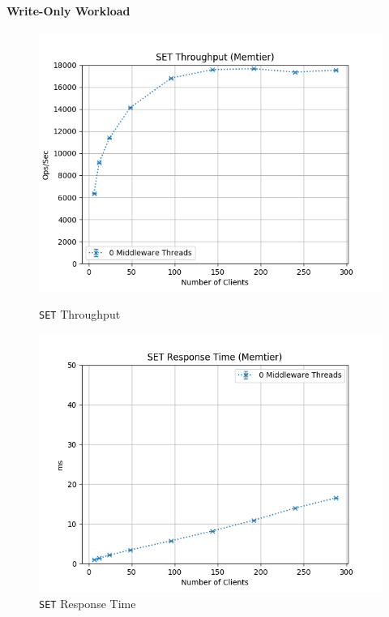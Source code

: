 \documentclass[11pt,a4paper]{article}
\begin{document}
\paragraph{Write-Only Workload}
%
\begin{figure}[H]
	\centering
	\captionsetup{width=0.4\textwidth}
    \begin{minipage}{0.5\textwidth}
        \centering
        \includegraphics[width=\textwidth]{../illustrations/plots/1_1_one_server/1-0/memtier_set_tp_s.png}
        \caption{\texttt{SET} Throughput}
        \label{fig:one_server_set_tp}
    \end{minipage}\hfill
    \begin{minipage}{0.5\textwidth}
        \centering
        \includegraphics[width=\textwidth]{../illustrations/plots/1_1_one_server/1-0/memtier_set_rt_ms.png}
        \caption{\texttt{SET} Response Time}
        \label{fig:one_server_set_rt}
    \end{minipage}
\end{figure}
\end{document}

